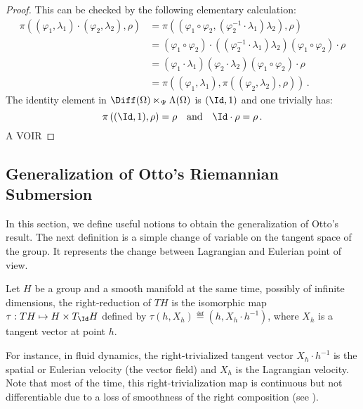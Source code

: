 \begin{proof}
  This can be checked by the following elementary calculation:
\begin{align*}
	\pi\left( (\varphi_1,\lambda_1) \cdot (\varphi_2,\lambda_2), \rho \right) 
	&= \pi \left((\varphi_1 \circ \varphi_2,( \varphi_2^{-1} \cdot \lambda_1) \lambda_2 ),\rho \right) \\ 
	& = (\varphi_1 \circ \varphi_2) \cdot (( \varphi_2^{-1} \cdot \lambda_1) \lambda_2 ) (\varphi_1 \circ \varphi_2) \cdot \rho \\ 
	& = (\varphi_1 \cdot \lambda_1) (\varphi_2 \cdot \lambda_2 )(\varphi_1\circ \varphi_2) \cdot \rho \\
	& = \pi \left( (\varphi_1,\lambda_1), \pi\left( (\varphi_2,\lambda_2), \rho \right) \right)\,.
\end{align*}
The identity element in $\Diff(\Omega) \ltimes_\Psi \Lambda(\Omega)$ is $(\Id,1)$ and one trivially has:
\begin{equation*}
	\pi\left(  (\Id,1), \rho \right) =   \rho
	\quad\text{and}\quad
 	\Id \cdot \rho = \rho \,.
\end{equation*}
A VOIR
\end{proof}

\subsection{Generalization of Otto's Riemannian Submersion}

In this section, we define useful notions to obtain the generalization of Otto's result. %
The next definition is a simple change of variable on the tangent space of the group. It represents the change between Lagrangian and Eulerian point of view.
\begin{definition}
Let $H$ be a group and a smooth manifold at the same time, possibly of infinite dimensions, the right-reduction of $TH$ is the isomorphic map $\tau : T H \mapsto H \times T_{\Id} H$ defined by $\tau(h,X_h) \eqdef (h, X_h \cdot h^{-1})$, where $X_h$ is a tangent vector at point $h$.
\end{definition}
For instance, in fluid dynamics, the right-trivialized tangent vector $X_h \cdot h^{-1}$ is the spatial or Eulerian velocity (the vector field) and $X_h$ is the Lagrangian velocity.
Note that most of the time, this right-trivialization map is continuous but not differentiable due to a loss of smoothness of the right composition (see \cite{em70}). 


